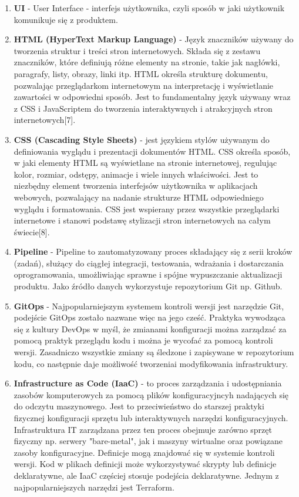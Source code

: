 \begin{enumerate}
    \item {\bf UI} - User Interface - interfejs użytkownika, czyli sposób w jaki użytkownik komunikuje się z produktem.
   
    \item {\bf HTML (HyperText Markup Language)} - Język znaczników używany do tworzenia struktur i treści stron internetowych. Składa się z zestawu znaczników, które definiują różne elementy na stronie, takie jak nagłówki, paragrafy, listy, obrazy, linki itp. HTML określa strukturę dokumentu, pozwalając przeglądarkom internetowym na interpretację i wyświetlanie zawartości w odpowiedni sposób. Jest to fundamentalny język używany wraz z CSS i JavaScriptem do tworzenia interaktywnych i atrakcyjnych stron internetowych[7].
    
    \item {\bf CSS (Cascading Style Sheets)} - jest językiem stylów używanym do definiowania wyglądu i prezentacji dokumentów HTML. CSS określa sposób, w jaki elementy HTML są wyświetlane na stronie internetowej, regulując kolor, rozmiar, odstępy, animacje i wiele innych właściwości. Jest to niezbędny element tworzenia interfejsów użytkownika w aplikacjach webowych, pozwalający na nadanie strukturze HTML odpowiedniego wyglądu i formatowania. CSS jest wspierany przez wszystkie przeglądarki internetowe i stanowi podstawę stylizacji stron internetowych na całym świecie[8].

    \item {\bf Pipeline} - Pipeline to zautomatyzowany proces składający się z serii kroków (zadań), służący do ciągłej integracji, testowania, wdrażania i dostarczania oprogramowania, umożliwiając sprawne i spójne wypuszczanie aktualizacji produktu. Jako źródło danych wykorzystuje repozytorium Git np. Github.

    \item {\bf GitOps} - Najpopularniejszym systemem kontroli wersji jest narzędzie Git, podejście GitOps zostało nazwane więc na jego cześć. Praktyka wywodząca się z kultury DevOps w myśl, że zmianami konfiguracji można zarządzać za pomocą praktyk przeglądu kodu i można je wycofać za pomocą kontroli wersji. Zasadniczo wszystkie zmiany są śledzone i zapisywane w repozytorium kodu, co następnie daje możliwość tworzenia\linebreak i modyfikowania infrastruktury.

    \item {\bf Infrastructure as Code (IaaC)} - to proces zarządzania i udostępniania zasobów komputerowych za pomocą plików konfiguracyjncyh nadających się do odczytu maszynowego. Jest to przeciwieństwo do starszej praktyki fizycznej konfiguracji sprzętu lub interaktywnych narzędzi konfiguracyjnych. Infrastruktura IT zarządzana przez ten proces obejmuje zarówno sprzęt fizyczny np. serwery "bare-metal", jak i maszyny wirtualne oraz powiązane zasoby konfiguracyjne. Definicje mogą znajdować się w systemie kontroli wersji. Kod w plikach definicji może wykorzystywać skrypty lub definicje deklaratywne, ale IaaC częściej stosuje podejścia deklaratywne. Jednym z najpopularniejszych narzędzi jest Terraform.
     
 \end{enumerate}
